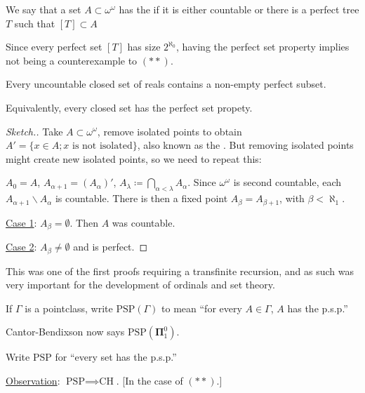 \documentclass[]{article}
\newcommand{\om}{\omega}
\newcommand{\bopi}{\bm{\Pi}}
\newcommand{\psp}{\textrm{PSP}}
\begin{document}
\begin{defin*}
    We say that a set $A\subset \om^\om$ has the  if it is either countable or there is a perfect tree $T$ such that $[T]\subset A$
\end{defin*}
\begin{remark*}
    Since every perfect set $[T]$ has size $2^{\aleph_0}$, having the perfect set property implies not being a counterexample to $(\ast\ast)$.
\end{remark*}
\begin{theorem*}
    Every uncountable closed set of reals contains a non-empty perfect subset.

    Equivalently, every closed set has the perfect set propety.
\end{theorem*}
\begin{proof}[Sketch.]
    Take $A\subset \om^\om$, remove isolated points to obtain $A' = \{x\in A;x\textrm{ is not isolated}\}$, also known as the . But removing isolated points might create new isolated points, so we need to repeat this:

    $A_0 = A$, $A_{\alpha+1} = (A_\alpha)'$, $A_\lambda \coloneqq \bigcap_{\alpha < \lambda}A_{\alpha}$. Since $\om^\om$ is second countable, each $A_{\alpha+1} \backslash A_\alpha$ is countable. There is then a fixed point $A_\beta = A_{\beta+1}$, with $\beta < \aleph_1$.
    
    \underline{Case 1}: $A_\beta = \emptyset$. Then $A$ was countable.

    \underline{Case 2}: $A_\beta \ne \emptyset $ and is perfect.
\end{proof}
This was one of the first proofs requiring a transfinite recursion, and as such was very important for the development of ordinals and set theory.

\begin{defin*}
    If $\Gamma$ is a pointclass, write $\psp(\Gamma)$ to mean ``for every $A \in \Gamma$, $A$ has the p.s.p.''
\end{defin*}

Cantor-Bendixson now says $\psp(\bopi_1^0)$.

\begin{defin*}
    Write $\psp$ for ``every set has the p.s.p.''
\end{defin*}

\underline{Observation}: $\psp \implies \textrm{CH}$. [In the case of $(\ast\ast)$.]
\end{document}
